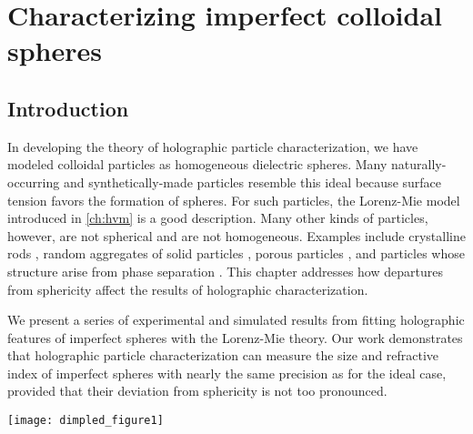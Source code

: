 \chapter{Characterizing imperfect colloidal spheres}
\label{ch:dimpled}

\section{Introduction}
In developing the theory of holographic particle characterization, we have modeled
colloidal particles as homogeneous
dielectric spheres. Many naturally-occurring and synthetically-made particles
resemble this ideal because surface tension favors the formation of spheres.
For such particles, the Lorenz-Mie model introduced in \autoref{ch:hvm} is a
good description. Many other kinds of particles, however, are not spherical and
are not homogeneous. Examples include crystalline rods \cite{fraden1995,cheong10},
random aggregates of solid particles \cite{witten1981,dimon1986,wang16a},
porous particles \cite{dimon1986,cheong11}, and particles whose
structure arise from phase separation \cite{kim15}.
This chapter addresses how departures from sphericity
affect the results of holographic characterization.

We present a series of experimental and simulated results from fitting
holographic features of imperfect spheres with the Lorenz-Mie theory.
Our work demonstrates that holographic particle characterization
can measure the size and refractive index
of imperfect spheres with nearly the same precision as for the ideal
case, provided that their
deviation from sphericity is not too pronounced. 

\begin{figure*}[t]
  \centering
  \texttt{[image: dimpled\_figure1]}
  \caption{(a) Scanning electron micrograph of a colloidal TPM sphere and 
    (b) a dimpled sphere.  Scale bars represent \SI{500}{\nm}.
    (c) and (d) Corresponding holograms for
    particles from the samples show in (a) and (b).  (e) \num{5000} measurements
    of sphere radius and refractive index for a single
    TPM sphere held in an optical tweezer.  Each point represents
    a single measurement, and is colored according to the
    relative density of measurements, $P(a_p,n_p)$.  (f) Equivalent result for
    a dimpled sphere.  (g) \num{5000} measurements of the radius and
    refractive index of a freely diffusing sphere.  (h) Equivalent
    result for a dimpled sphere \cite{hannel15}.
   }
  \label{fig:singleparticle}
\end{figure*}

